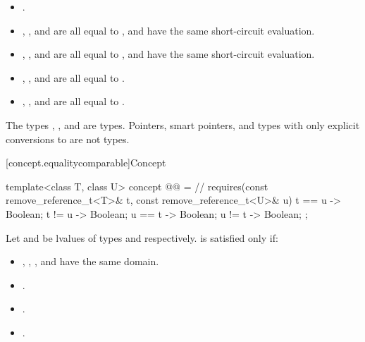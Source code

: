 \begin{itemize}
\item {}.
\item {}, , and
       are all equal to
      , and have the same short-circuit
      evaluation.
\item {}, , and
       are all equal to
      , and have the same short-circuit
      evaluation.
\item {}, , and
       are all equal to
      .
\item {}, , and
       are all equal to
      .
\end{itemize}

\pnum
\begin{example}
The types , , and
 are 
types. Pointers, smart pointers, and types with only explicit conversions to
 are not  types.
\end{example}

[concept.equalitycomparable]{Concept }

\begin{itemdecl}
template<class T, class U>
  concept @@ = // \expos
    requires(const remove_reference_t<T>& t,
             const remove_reference_t<U>& u) {
      { t == u } -> Boolean;
      { t != u } -> Boolean;
      { u == t } -> Boolean;
      { u != t } -> Boolean;
    };
\end{itemdecl}

\begin{itemdescr}
\pnum
Let  and  be lvalues of types
 and
 respectively.
is satisfied only if:
\begin{itemize}
\item {}, , , and 
      have the same domain.
\item {}.
\item {}.
\item {}.
\end{itemize}
\end{itemdescr}

